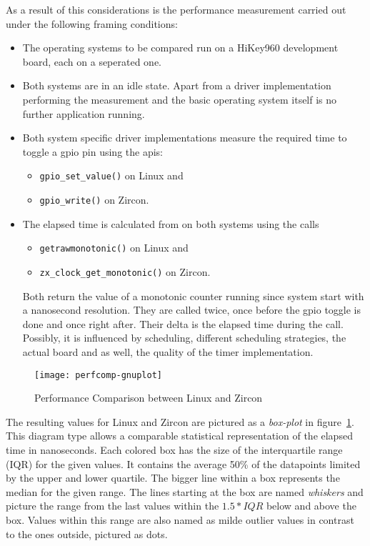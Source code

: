 As a result of this considerations is the performance measurement carried out under the following framing conditions:
\begin{itemize}
    \item The operating systems to be compared run on a HiKey960 development board, each on a seperated one.
    \item Both systems are in an idle state. Apart from a driver implementation performing the measurement and the basic operating system itself is no further application running.
    \item Both system specific driver implementations measure the required time to toggle a \ac{gpio} pin using the \acp{api}:
        \begin{itemize}
            \item \texttt{gpio_set_value()} on Linux and
            \item \texttt{gpio_write()} on Zircon.
        \end{itemize}
    \item The elapsed time is calculated from on both systems using the calls
        \begin{itemize}
            \item \texttt{getrawmonotonic()} on Linux and
            \item \texttt{zx_clock_get_monotonic()} on Zircon.
        \end{itemize}
        Both return the value of a monotonic counter running since system start with a nanosecond resolution.
        They are called twice, once before the \ac{gpio} toggle is done and once right after.
        Their delta is the elapsed time during the call.
        Possibly, it is influenced by scheduling, different scheduling strategies, the actual board and as well, the quality of the timer implementation.
\end{itemize}

\begin{figure} [t]
    \centering
    \texttt{[image: perfcomp-gnuplot]}
    \caption{Performance Comparison between Linux and Zircon}\label{pic:perftest}
\end{figure}

The resulting values for Linux and Zircon are pictured as a \textit{box-plot} in figure~\ref{pic:perftest}.
This diagram type allows a comparable statistical representation of the elapsed time in nanoseconds.
Each colored box has the size of the interquartile range (IQR) for the given values.
It contains the average 50\% of the datapoints limited by the upper and lower quartile.
The bigger line within a box represents the median for the given range.
The lines starting at the box are named \textit{whiskers} and picture the range from the last values within the $1.5 * IQR$ below and above the box.
Values within this range are also named as milde outlier values in contrast to the ones outside, pictured as dots. 

